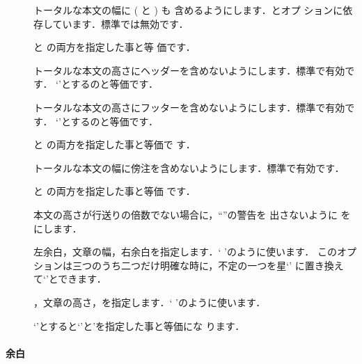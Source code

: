 \begin{description}
 \item[]
  トータルな本文の幅に ( と ) も
  含めるようにします．とオプ
  ションに依存しています．標準では無効です．
 \item[]
   と  の両方を指定した事と等
  価です．
 \item[]
  トータルな本文の高さにヘッダーを含めないようにします．標準で有効です．
  `'とするのと等価です．
 \item[]
  トータルな本文の高さにフッターを含めないようにします．標準で有効です．
  `'とするのと等価です．
 \item[]
   と  の両方を指定した事と等価で
  す．
 \item[]
  トータルな本文の幅に傍注を含めないようにします．標準で有効です．
 \item[]
   と  の両方を指定した事と等価
  です．
 \item[]
  本文の高さが行送りの倍数でない場合に，``''の警告を
  出さないように  を  にします．
 \item[]
  左余白，文章の幅，右余白を指定します．`%
  'のように使います．
  このオプションは三つのうち二つだけ明確な時に，不定の一つを星`\str{*}'
  に置き換えて`'とできます．
 \item[]
  ，文章の高さ，を指定します．`%
  'のように使います．
 \item[]
  `'とすると`'と'を指定した事と等価にな
  ります．
\end{description}

\paragraph{余白}

